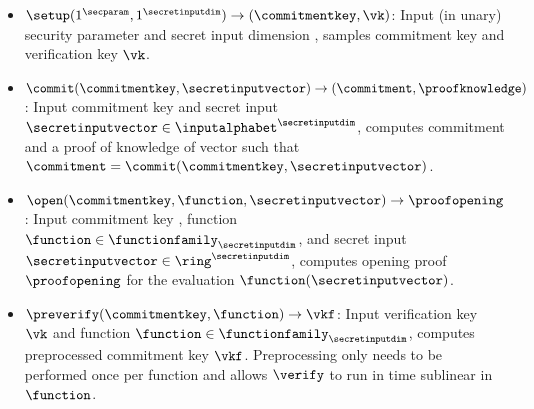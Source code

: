 \begin{definition}
\begin{itemize}[nosep]
                \item $\setup(1^\secparam,1^\secretinputdim) \to (\commitmentkey,\vk)$: Input (in unary) security parameter \secparam and secret input dimension \secretinputdim, samples commitment key \commitmentkey and verification key $\vk$.
                \item $\commit(\commitmentkey,\secretinputvector) \to (\commitment,\proofknowledge)$: Input commitment key \commitmentkey and secret input $\secretinputvector \in \inputalphabet^\secretinputdim$, computes commitment \commitment and a proof of knowledge \proofknowledge of vector \secretinputvector such that $\commitment = \commit(\commitmentkey, \secretinputvector)$.
                \item $\open(\commitmentkey, \function, \secretinputvector) \to \proofopening$: Input commitment key \commitmentkey, function $\function \in \functionfamily_{\secretinputdim}$, and secret input $\secretinputvector \in \ring^\secretinputdim$, computes opening proof $\proofopening$ for the evaluation $\function(\secretinputvector)$.
                \item $\preverify(\commitmentkey, \function) \to \vkf$: Input verification key $\vk$ and function $\function \in \functionfamily_{\secretinputdim}$, computes preprocessed commitment key $\vkf$. Preprocessing only needs to be performed once per function and allows $\verify$ to run in time sublinear in $\function$.

\end{itemize}
\end{definition}

